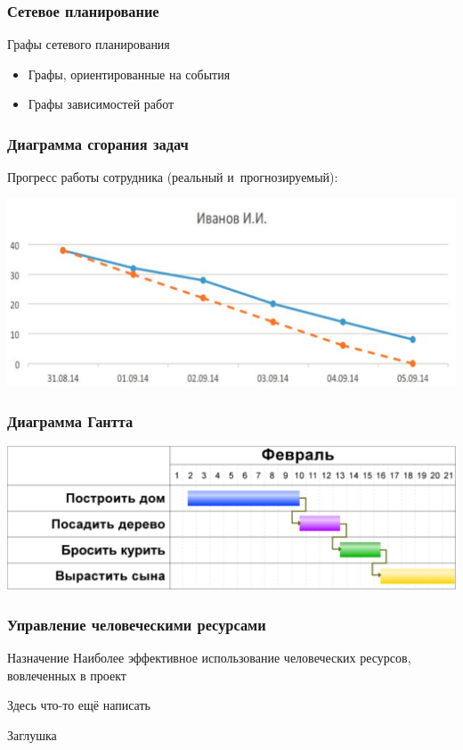 \documentclass{../industrial-development}
\begin{document}
    \begin{frame} \frametitle{Сетевое планирование}
        \begin{block}{Графы сетевого планирования}
            \begin{itemize}
                \item Графы, ориентированные на события
                \item Графы зависимостей работ
            \end{itemize}
        \end{block}
    \end{frame}

    \begin{frame} \frametitle{Диаграмма сгорания задач}
        Прогресс работы сотрудника (реальный и~прогнозируемый):
        \centerline{\includegraphics[width=1\textwidth]{ivanov.pdf}}
    \end{frame}
    
    \begin{frame} \frametitle{Диаграмма Гантта}
        \centerline{\includegraphics[width=1\textwidth]{gantt.pdf}}
    \end{frame}
    
    \begin{frame} \frametitle{Управление человеческими ресурсами}
        \begin{block}{Назначение}
            Наиболее эффективное использование человеческих ресурсов, вовлеченных в проект
        \end{block}
        Здесь что-то ещё написать
    \end{frame}
    \lecturenotes
    Заглушка
\end{document}
